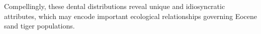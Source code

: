 \documentclass[]{rsos}%
\begin{document}
Compellingly, these dental distributions reveal unique and idiosyncratic attributes, which may encode important ecological relationships governing Eocene sand tiger populations.

\end{document}
